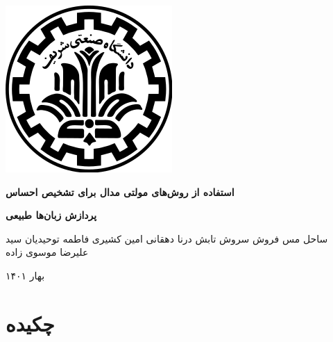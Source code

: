 \documentclass[11pt, fleqn]{article}
\begin{document}
\renewcommand\refname{}




\begin{center}

			\vspace{-1cm}
		   \includegraphics[scale=0.5]{Sharif}%
		   \vspace{2cm}

\textbf{
\Huge{
استفاده از روش‌های مولتی مدال برای تشخیص احساس
}}
\vspace{3cm}

\textbf{
\huge{
پردازش زبان‌ها طبیعی
}}

\vspace{10mm}


\Large{
ساحل مس فروش
سروش تابش
درنا دهقانی
امین کشیری
فاطمه توحیدیان
سید علیرضا موسوی زاده
}

\vspace{4cm}

\large{
بهار ۱۴۰۱
}
\end{center}


\newpage
\section*{چکیده}



\newhline


 
\newhline
\end{document}
